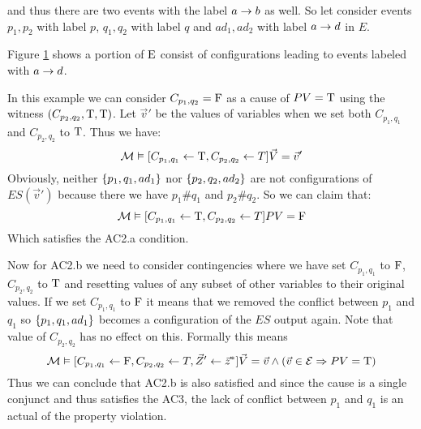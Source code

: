 \begin{example}
    and thus there are two events with the label $a \rightarrow b$ as well.
    So let consider events $p_1,p_2$ with label $p$,
    $q_1,q_2$ with label $q$ and $ad_1,ad_2$ with label $a \rightarrow d$ 
    in $E$.
    \begin{figure}
        \centering
        \caption{}
        \label{fig:blacklist:es}
    \end{figure}
    Figure \ref{fig:blacklist:es} shows a portion of $\mathrm{E}$ consist of
    configurations leading to events labeled with $a\rightarrow d$.

    In this example we can consider $C_{p_1,q_2} = \mathrm{F}$ as a cause of 
    $PV = \mathrm{T}$ using the witness $(C_{p_2,q_2},\mathrm{T},\mathrm{T})$.
    Let $\vec v'$ be the values of variables when we set both 
    $C_{p_1,q_1}$ and $C_{p_2,q_2}$ to $\mathrm{T}$.
    Thus we have:
    \begin{equation*}
        \mathcal{M} \vDash [C_{p_1,q_1} \leftarrow \mathrm{T}, C_{p_2,q_2} \leftarrow T] 
        \vec V = \vec v'
    \end{equation*}
    Obviously, neither $\{p_1,q_1,ad_1\}$ nor $\{p_2,q_2,ad_2\}$ 
    are not configurations of $ES(\vec v')$ because there we have
    $p_1 \# q_1$ and $p_2 \# q_2$. 
    So we can claim that:
    \begin{equation*}
        \mathcal{M} \vDash [C_{p_1,q_1} \leftarrow \mathrm{T}, C_{p_2,q_2} \leftarrow T] 
        PV = \mathrm{F}
    \end{equation*}
    Which satisfies the AC2.a condition.

    Now for AC2.b we need to consider contingencies where we have
    set $C_{p_1,q_1}$ to $\mathrm{F}$, $C_{p_2,q_2}$ to $\mathrm{T}$ and resetting 
    values of any subset of other variables to their original values.
    If we set $C_{p_1,q_1}$ to $\mathrm{F}$ it means that we removed
    the conflict between $p_1$ and $q_1$ so $\{p_1,q_1,ad_1\}$ becomes
    a configuration of the $ES$ output again.
    Note that value of $C_{p_2,q_2}$ has no effect on this.
    Formally this means
    \begin{equation*}
        \mathcal{M} \vDash [C_{p_1,q_1} \leftarrow \mathrm{F}, C_{p_2,q_2} \leftarrow T
            ,\vec Z' \leftarrow \vec z^*
        ] \vec V = \vec v \wedge 
        (\vec v \in \mathcal{E} \Rightarrow PV = \mathrm{T})
    \end{equation*}
    Thus we can conclude that AC2.b is also satisfied and since the 
    cause is a single conjunct and thus satisfies the AC3, 
    the lack of conflict between $p_1$ and $q_1$ is an actual of 
    the property violation. 


\end{example}
